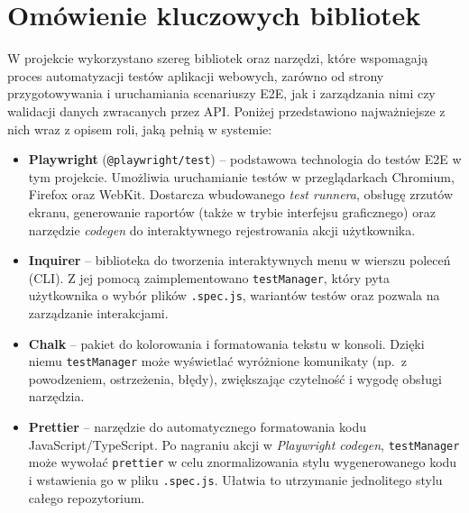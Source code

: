 \documentclass[12pt]{report}
\begin{document}
\section{Omówienie kluczowych bibliotek}
\label{sec:omowienie-bibliotek}

W projekcie wykorzystano szereg bibliotek oraz narzędzi, które wspomagają proces automatyzacji testów aplikacji webowych, zarówno od strony przygotowywania i uruchamiania scenariuszy E2E, jak i zarządzania nimi czy walidacji danych zwracanych przez API. Poniżej przedstawiono najważniejsze z nich wraz z opisem roli, jaką pełnią w systemie:

\begin{itemize}
    \item \textbf{Playwright} (\verb|@playwright/test|) -- podstawowa technologia do testów E2E w tym projekcie. Umożliwia uruchamianie testów w przeglądarkach Chromium, Firefox oraz WebKit. Dostarcza wbudowanego \emph{test runnera}, obsługę zrzutów ekranu, generowanie raportów (także w trybie interfejsu graficznego) oraz narzędzie \emph{codegen} do interaktywnego rejestrowania akcji użytkownika.

    \item \textbf{Inquirer} -- biblioteka do tworzenia interaktywnych menu w wierszu poleceń (CLI). Z jej pomocą zaimplementowano \texttt{testManager}, który pyta użytkownika o wybór plików \texttt{.spec.js}, wariantów testów oraz pozwala na zarządzanie interakcjami. 

    \item \textbf{Chalk} -- pakiet do kolorowania i formatowania tekstu w konsoli. Dzięki niemu \texttt{testManager} może wyświetlać wyróżnione komunikaty (np.~z powodzeniem, ostrzeżenia, błędy), zwiększając czytelność i wygodę obsługi narzędzia.

    \item \textbf{Prettier} -- narzędzie do automatycznego formatowania kodu JavaScript/TypeScript. Po nagraniu akcji w \emph{Playwright codegen}, \texttt{testManager} może wywołać \texttt{prettier} w celu znormalizowania stylu wygenerowanego kodu i wstawienia go w pliku \texttt{.spec.js}. Ułatwia to utrzymanie jednolitego stylu całego repozytorium.


\end{itemize}
\end{document}
